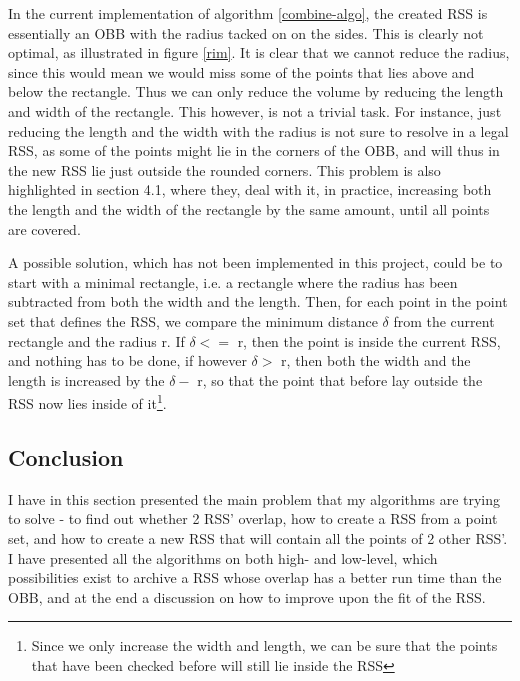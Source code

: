 In the current implementation of algorithm \ref{combine-algo}, the created RSS is essentially an OBB with the radius tacked on on the sides. This is clearly not optimal, as illustrated in figure \ref{rim}. It is clear that we cannot reduce the radius, since this would mean we would miss some of the points that lies above and below the rectangle. Thus we can only reduce the volume by reducing the length and width of the rectangle. This however, is not a trivial task. For instance, just reducing the length and the width with the radius is not sure to resolve in a legal RSS, as some of the points might lie in the corners of the OBB, and will thus in the new RSS lie just outside the rounded corners. This problem is also highlighted in \cite{Larsen99fastproximity} section 4.1, where they, deal with it, in practice, increasing both the length and the width of the rectangle by the same amount, until all points are covered.

A possible solution, which has not been implemented in this project, could be to start with a minimal rectangle, i.e. a rectangle where the radius has been subtracted from both the width and the length. Then, for each point in the point set that defines the RSS, we compare the minimum distance $\delta$ from the current rectangle and the radius r. If $\delta <=$ r, then the point is inside the current RSS, and nothing has to be done, if however $\delta >$ r, then both the width and the length is increased by the $\delta -$ r, so that the point that before lay outside the RSS now lies inside of it\footnote{Since we only increase the width and length, we can be sure that the points that have been checked before will still lie inside the RSS}.
 
\subsection{Conclusion}
I have in this section presented the main problem that my algorithms are trying to solve - to find out whether 2 RSS' overlap, how to create a RSS from a point set, and how to create a new RSS that will contain all the points of 2 other RSS'. I have presented all the algorithms on both high- and low-level, which possibilities exist to archive a RSS whose overlap has a better run time than the OBB, and at the end a discussion on how to improve upon the fit of the RSS.
